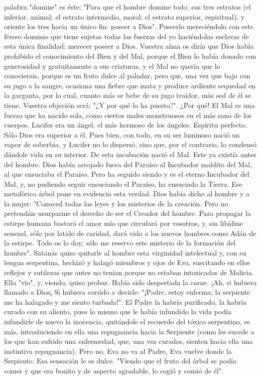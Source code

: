 \documentclass[12pt]{book} %
\begin{document}
palabra "domine" es éste: "Para que el hombre domine todo: sus tres estratos (el inferior, animal; el estrato intermedio, moral; el estrato superior, espiritual), y oriente los tres hacia un único fin: poseer a Dios". Poseerlo mereciéndolo con este férreo dominio que tiene sujetas todas las fuerzas del yo haciéndolas esclavas de esta única finalidad: merecer poseer a Dios. Vuestra alma os diría que Dios había prohibido el conocimiento del Bien y del Mal, porque el Bien lo había donado con generosidad y gratuitamente a sus criaturas, y el Mal no quería que lo conocierais, porque es un fruto dulce al paladar, pero que, una vez que baja con su jugo a la sangre, ocasiona una fiebre que mata y produce ardiente sequedad en la garganta, por lo cual, cuanto más se bebe de su jugo traidor, más sed de él se tiene. 
Vuestra objeción será: "¿Y por qué lo ha puesto?". ¿Por qué! El Mal es una fuerza que ha nacido sola, como ciertos males monstruosos en el más sano de los cuerpos. 
Lucifer era un ángel, el más hermoso de los ángeles. Espíritu perfecto. Sólo Dios era superior a él. Pues bien, con todo, 
en su ser luminoso nació un vapor de soberbia, y Lucifer no lo dispersó, sino que, por el contrario, lo condensó dándole vida en su interior. De esta incubación nació el Mal. Este ya existía antes del hombre. Dios había arrojado fuera del Paraíso al Incubador maldito del Mal, al que ensuciaba el Paraíso. Pero ha seguido siendo y es el eterno Incubador del Mal, y, no pudiendo seguir ensuciando el Paraíso, ha ensuciado la Tierra. 
Ese metafórico árbol pone en evidencia esta verdad. Dios había dicho al hombre y a la mujer: "Conoced todas las leyes y los misterios de la creación. Pero no pretendáis usurparme el derecho de ser el Creador del hombre. Para propagar la estirpe humana bastará el amor mío que circulará por vosotros, y, sin libídine sensual, sólo por latido de caridad, dará vida a los nuevos hombres como Adán de la estirpe. Todo os lo doy; sólo me reservo este misterio de la formación del hombre". 
Satanás quiso quitarle al hombre esta virginidad intelectual y, con su lengua serpentina, hechizó y halagó miembros y 
ojos de Eva, suscitando en ellos reflejos y sutilezas que antes no tenían porque no estaban intoxicados de Malicia. 
Ella "vio", y, viendo, quiso probar. Había sido despertada la carne. ¡Ah, si hubiera llamado a Dios¡ Si hubiera corrido a decirle: "¡Padre, estoy enferma; la serpiente me ha halagado y me siento turbada!". El Padre la habría purificado, la habría curado con su aliento, pues lo mismo que le había infundido la vida podía infundirle de nuevo la inocencia, quitándole el recuerdo del tóxico serpentino, es más, introduciendo en ella una repugnancia hacia la Serpiente (como les sucede a los que han sufrido una enfermedad, que, una vez curados, sienten hacia ella una instintiva repugnancia). Pero no, Eva no va al Padre, Eva vuelve donde la Serpiente. Esa sensación le es dulce. "Viendo que el fruto del árbol se podía comer y que era bonito y de aspecto agradable, lo cogió y comió de él". 
\end{document}
